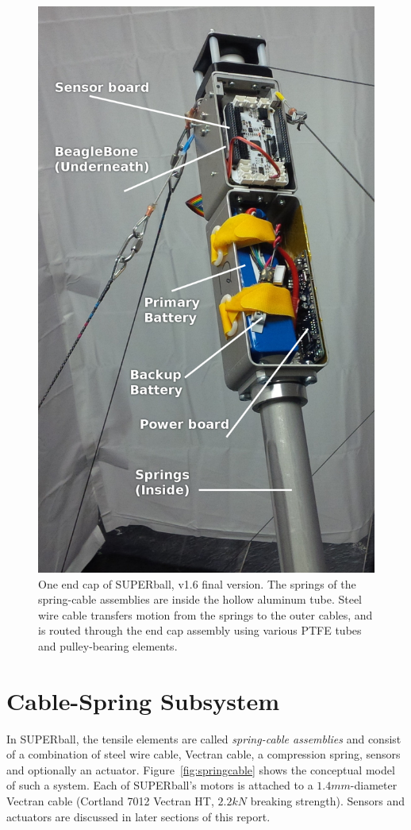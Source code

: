 \documentclass[12pt]{report}
\begin{document}
\begin{figure}
      \centering
      \includegraphics[width=.38\columnwidth]{img/endcap_upclose_sensorboard_labelled.jpg}
      \caption{One end cap of SUPERball, v1.6 final version. The springs of the spring-cable assemblies are inside the hollow aluminum tube. Steel wire cable transfers motion from the springs to the outer cables, and is routed through the end cap assembly using various PTFE tubes and pulley-bearing elements.}
      \label{fig:final_endcap}
      \vspace{-0.2cm}
\end{figure}

\section{Cable-Spring Subsystem}

In SUPERball, the tensile elements are called \emph{spring-cable assemblies} and consist of a combination of steel wire cable, Vectran cable, a compression spring, sensors and optionally an actuator.
Figure~\ref{fig:springcable} shows the conceptual model of such a system.
Each of SUPERball's motors is attached to a $1.4mm$-diameter Vectran cable (Cortland 7012 Vectran HT, $2.2kN$ breaking strength).
Sensors and actuators are discussed in later sections of this report.
\end{document}

